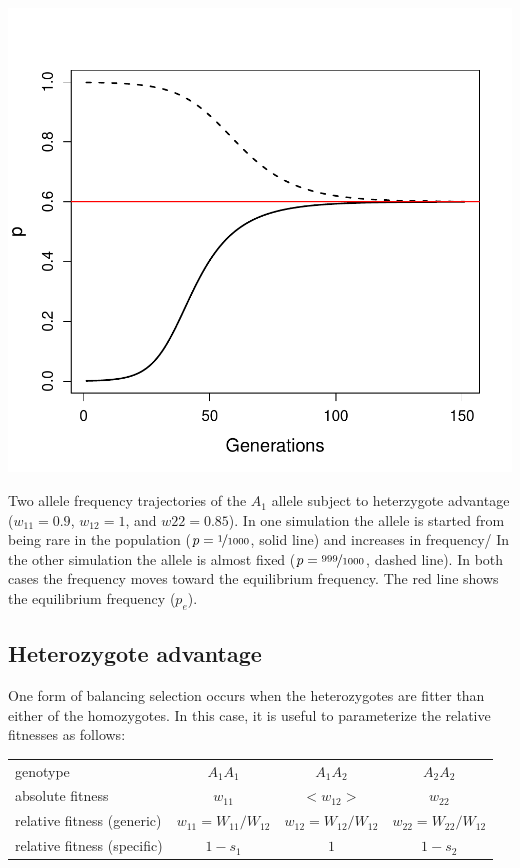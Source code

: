 \begin{marginfigure}[-3cm]
\begin{center}
  \includegraphics[width = \textwidth]{figures/het_advant_traj.pdf}
\end{center}
\caption{Two allele frequency trajectories of the $A_1$ allele subject to
  heterzygote advantage ($w_{11}=0.9$, $w_{12}=1$, and $w22=0.85$). In
one simulation the allele is started from being rare in the population
($p=\nicefrac{1}{1000}$, solid line) and increases in frequency/ In
the other simulation the allele is almost
fixed ($p=\nicefrac{999}{1000}$, dashed line). In both cases the
frequency moves toward the equilibrium frequency. The red line shows
the equilibrium frequency ($p_e$). } \label{fig:het_advant_traj}
\end{marginfigure}


\subsection{Heterozygote advantage}
One form of balancing selection occurs when the heterozygotes are fitter than either
of the homozygotes. In this case, it is useful to parameterize the relative fitnesses as follows:\\
\begin{center}
\begin{tabular}{lccc}
	genotype & $A_1A_1$ & $A_1A_2$ & $A_2A_2$ \\
	absolute fitness & $w_{11}$ & $<w_{12}>$ & $w_{22}$ \\
	relative fitness (generic) & $w_{11}=W_{11}/W_{12}$ & $w_{12} = W_{12}/W_{12}$ & $w_{22} = W_{22}/W_{12}$ \\
	relative fitness (specific)  & $1-s_1$ & $1$ & $1-s_2$ \\
\end{tabular}\\
\end{center}

